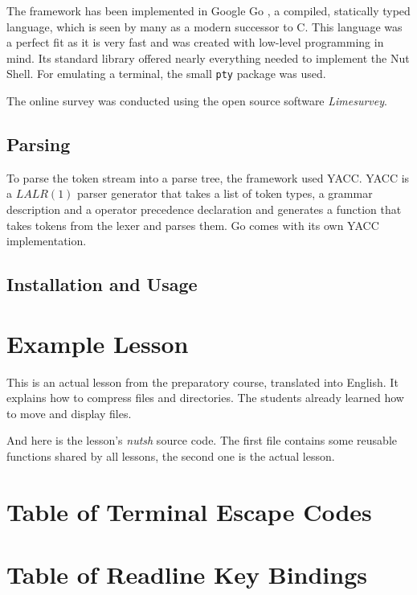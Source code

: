 \documentclass[paper=a4,twoside,abstract=on,cleardoublepage=empty,numbers=noenddot,toc=bib,12pt,appendixprefix=true]{scrreprt}
\begin{document}
The framework has been implemented in Google Go \cite{google13}, a compiled, statically typed language, which is seen by many as a modern successor to C. This language was a perfect fit as it is very fast and was created with low-level programming in mind. Its standard library offered nearly everything needed to implement the Nut Shell. For emulating a terminal, the small \texttt{pty} package was used. 

The online survey was conducted using the open source software \emph{Limesurvey}. 

\section*{Parsing}

To parse the token stream into a parse tree, the framework used \textsc{YACC}. \textsc{YACC} is a $LALR(1)$ parser generator that takes a list of token types, a grammar description and a operator precedence declaration and generates a function that takes tokens from the lexer and parses them. Go comes with its own YACC implementation. 


\section*{Installation and Usage}


\chapter{Example Lesson}
\label{sec:nutshexample}

This is an actual lesson from the preparatory course, translated into English. It explains how to compress files and directories. The students already learned how to move and display files.


%
And here is the lesson's \emph{nutsh} source code. The first file contains some reusable functions shared by all lessons, the second one is the actual lesson.



\label{lst:compress}


\chapter{Table of Terminal Escape Codes}
\label{sec:esc}


\chapter{Table of Readline Key Bindings}
\label{sec:keybindings}


\nocite{why05}
\nocite{fowler10}
\nocite{upt02}
\nocite{dragonbook06}
\nocite{louden03}

%
\printbibliography
\end{document}
